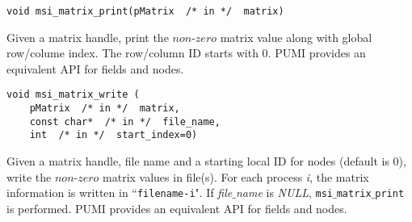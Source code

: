 \begin{verbatim}
void msi_matrix_print(pMatrix  /* in */  matrix)
\end{verbatim}\vspace{-.5cm}\hspace{1cm}
Given a matrix handle, print the $non$-$zero$ matrix value along with global row/colume index. The row/column ID starts with 0. PUMI provides an equivalent API for fields and nodes.

\begin{verbatim}
void msi_matrix_write (
    pMatrix  /* in */  matrix, 
    const char*  /* in */  file_name, 
    int  /* in */  start_index=0)
\end{verbatim}\vspace{-.5cm}\hspace{1cm}
Given a matrix handle, file name and a starting local ID for nodes (default is 0), write the $non$-$zero$ matrix values in file(s). For each process \textit{i}, the matrix information is written in ``\texttt{filename-i}". If \textit{file$\_$name} is \textit{NULL}, \texttt{msi$\_$matrix$\_$print} is performed.
PUMI provides an equivalent API for fields and nodes. 
